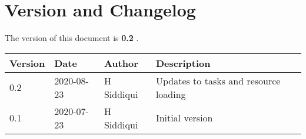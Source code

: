 \section{Version and Changelog}

The version of this document is {\bf 0.2} .

\begin{table}[H]
    \begin{tabular}{|l|l|l|p{10cm}| }
    \hline
    {\bf Version} & {\bf Date} & {\bf Author} & {\bf Description} \\ \hline
    0.2 & 2020-08-23 & H Siddiqui & Updates to tasks and resource loading \\ \hline
    0.1 & 2020-07-23 & H Siddiqui & Initial version \\ \hline
    \end{tabular}
\end{table}
